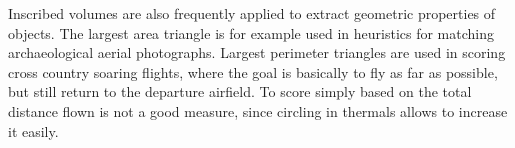 Inscribed volumes are also frequently applied to extract
geometric properties of objects. The largest area triangle is for example used in
heuristics for matching archaeological aerial photographs. Largest
perimeter triangles are used in scoring cross country soaring flights,
where the goal is basically to fly as far as possible, but still
return to the departure airfield. To score simply based on the total
distance flown is not a good measure, since circling in thermals
allows to increase it easily.



